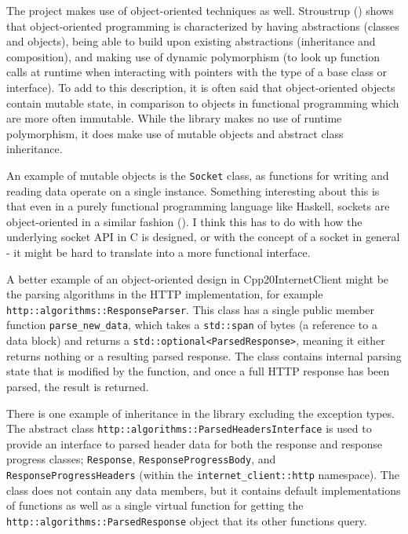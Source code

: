 \documentclass[12pt, a4paper]{article}
\begin{document}
The project makes use of object-oriented techniques as well. Stroustrup (\citeyear{CppNotJustObjectOriented}) shows that object-oriented programming is characterized by having abstractions (classes and objects), being able to build upon existing abstractions (inheritance and composition), and making use of dynamic polymorphism (to look up function calls at runtime when interacting with pointers with the type of a base class or interface). To add to this description, it is often said that object-oriented objects contain mutable state, in comparison to objects in functional programming which are more often immutable. While the library makes no use of runtime polymorphism, it does make use of mutable objects and abstract class inheritance. 

An example of mutable objects is the \texttt{Socket} class, as functions for writing and reading data operate on a single instance. Something interesting about this is that even in a purely functional programming language like Haskell, sockets are object-oriented in a similar fashion (\cite{HaskellSocket}). I think this has to do with how the underlying socket API in C is designed, or with the concept of a socket in general - it might be hard to translate into a more functional interface. 

A better example of an object-oriented design in Cpp20InternetClient might be the parsing algorithms in the HTTP implementation, for example \\
\texttt{http::algorithms::ResponseParser}. This class has a single public member function \texttt{parse\_new\_data}, which takes a \texttt{std::span} of bytes (a reference to a data block) and returns a \texttt{std::optional<ParsedResponse>}, meaning it either returns nothing or a resulting parsed response. The class contains internal parsing state that is modified by the function, and once a full HTTP response has been parsed, the result is returned.

There is one example of inheritance in the library excluding the exception types. The abstract class \texttt{http::algorithms::ParsedHeadersInterface} is used to provide an interface to parsed header data for both the response and response progress classes; \texttt{Response}, \texttt{ResponseProgressBody}, and \texttt{ResponseProgressHeaders} (within the \texttt{internet\_client::http} namespace). The class does not contain any data members, but it contains default implementations of functions as well as a single virtual function for getting the \texttt{http::algorithms::ParsedResponse} object that its other functions query.
\end{document}
